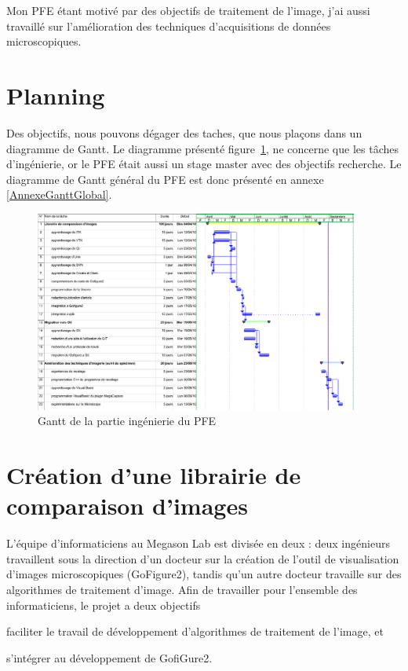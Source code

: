 Mon PFE étant motivé par des objectifs de traitement de l'image, j'ai aussi travaillé sur l'amélioration
 des techniques d'acquisitions de données microscopiques.
 
 
\section*{Planning} 
 
Des objectifs, nous pouvons dégager des taches, que nous plaçons dans un diagramme de Gantt. Le diagramme présenté figure~\ref{fig:GanttPFEInge}, ne concerne que les tâches d'ingénierie, or le PFE était aussi un stage master avec des objectifs recherche. Le diagramme de Gantt général du PFE est donc présenté en annexe \ref{AnnexeGanttGlobal}.
 
\begin{figure}[h]
\begin{center}
\leavevmode
\includegraphics[angle=-90, width=0.95\textwidth]{pictures/GanttPFEInge}
\end{center}
\caption{Gantt de la partie ingénierie du PFE}
\label{fig:GanttPFEInge}
\end{figure}



\section{Création d'une librairie de comparaison d'images}

L'équipe d'informaticiens au Megason Lab est divisée en deux : deux ingénieurs travaillent sous la direction d'un docteur sur la
 création de l'outil de visualisation d'images microscopiques (GoFigure2), tandis qu'un autre docteur travaille sur
 des algorithmes de traitement d'image. Afin de travailler pour l'ensemble des informaticiens, le projet a deux objectifs
\begin{inparaenum}[(i)]
  \item faciliter le travail de développement d'algorithmes de traitement de l'image, et 
  \item s'intégrer au développement de GofiGure2.
\end{inparaenum}

